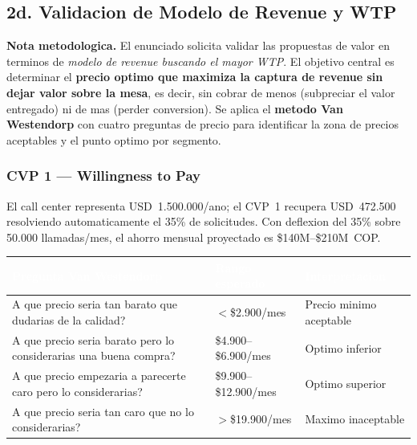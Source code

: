 \documentclass[12pt,a4paper]{article}
\begin{document}
\subsection{2d. Validacion de Modelo de Revenue y WTP}

\begin{insight}
\textbf{Nota metodologica.} El enunciado solicita validar las propuestas de valor
en terminos de \textit{modelo de revenue buscando el mayor WTP}. El objetivo central
es determinar el \textbf{precio optimo que maximiza la captura de revenue sin dejar
valor sobre la mesa}, es decir, sin cobrar de menos (subpreciar el valor entregado)
ni de mas (perder conversion). Se aplica el \textbf{metodo Van Westendorp} con
cuatro preguntas de precio para identificar la zona de precios aceptables y el punto
optimo por segmento.
\end{insight}

\subsubsection{CVP 1 --- Willingness to Pay}

El call center representa USD~1.500.000/ano; el CVP~1 recupera USD~472.500
resolviendo automaticamente el 35\% de solicitudes. Con deflexion del 35\%
sobre 50.000 llamadas/mes, el ahorro mensual proyectado es \$140M--\$210M~COP.

\begin{center}
\begin{tabularx}{\linewidth}{L{6.2cm}C{2.3cm}X}
\toprule
{}
\textcolor{white}{\textbf{Pregunta Van Westendorp}} &
\textcolor{white}{\textbf{Rango esperado}} &
\textcolor{white}{\textbf{Interpretacion}} \\
\midrule
A que precio seria tan barato que dudarias de la calidad? &
$<$\$2.900/mes & Precio minimo aceptable \\
\addlinespace
A que precio seria barato pero lo considerarias una buena compra? &
\$4.900--\$6.900/mes & Optimo inferior \\
\addlinespace
A que precio empezaria a parecerte caro pero lo considerarias? &
\$9.900--\$12.900/mes & Optimo superior \\
\addlinespace
A que precio seria tan caro que no lo considerarias? &
$>$\$19.900/mes & Maximo inaceptable \\
\bottomrule
\end{tabularx}
\end{center}
\end{document}
